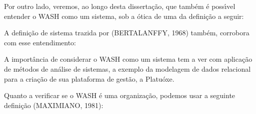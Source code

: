 \documentclass[
12pt,		%
openright,	%
twoside,  %
a4paper,			%
chapter=TITLE,		%
english,			%
french,				%
spanish,			%
brazil				%
]{USPSC-classe/USPSC}
\begin{document}
Por outro lado, veremos, ao longo desta disserta\c{c}\~ao, que tamb\'em \'e poss\'{\i}vel entender o WASH como um sistema, sob a \'otica de uma da defini\c{c}\~ao a seguir:


















\noindent\begin{center}\mbox{\centering{}}\end{center}


A defini\c{c}\~ao de sistema trazida por (BERTALANFFY, 1968) tamb\'em, corrobora com esse entendimento:


















\noindent\begin{center}\mbox{\centering{}}\end{center}


A import\^ancia de considerar o WASH como um sistema tem a ver com aplica\c{c}\~ao de m\'etodos de an\'alise de sistemas, a exemplo da modelagem de dados relacional para a cria\c{c}\~ao de sua plataforma de gest\~ao, a \textquotedbl Platu\'oxe\textquotedbl .

















Quanto a verificar se o WASH \'e uma organiza\c{c}\~ao, podemos usar a seguinte defini\c{c}\~ao (MAXIMIANO, 1981):
\end{document}
